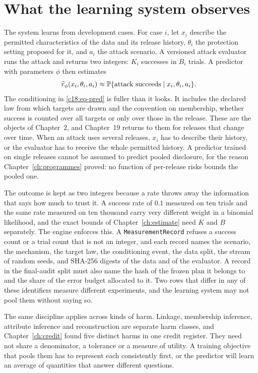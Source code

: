 \section{What the learning system observes}\label{c18:sec-observe}

The system learns from development cases. For case $i$, let $x_i$ describe the permitted
characteristics of the data and its release history, $\theta_i$ the protection setting proposed for it, and $a_i$ the attack scenario. A versioned attack evaluator runs the attack and returns two integers: $K_i$
successes in $B_i$ trials. A predictor with parameters $\phi$ then estimates
\begin{equation}\label{c18:eq-pred}
\widehat r_\phi(x_i,\theta_i,a_i)\approx \mathbb{P}\{\text{attack succeeds}\mid x_i,\theta_i,a_i\}.
\end{equation}
The conditioning in \eqref{c18:eq-pred} is fuller than it looks. It includes the declared law from which
targets are drawn and the convention on membership, whether success is counted over all
targets or only over those in the release. These are the objects of Chapter~2, and Chapter~19
returns to them for releases that change over time. When an attack uses several releases, $x_i$
has to describe their history, or the evaluator has to receive the whole permitted history. A
predictor trained on single releases cannot be assumed to predict pooled disclosure, for the
reason Chapter~\ref{ch:programmes} proved: no function of per-release risks bounds the pooled one.

The outcome is kept as two integers because a rate throws away the information that says
how much to trust it. A success rate of $0.1$ measured on ten trials and the same rate measured
on ten thousand carry very different weight in a binomial likelihood, and the exact bounds
of Chapter~\ref{ch:estimate} need $K$ and $B$ separately. The engine enforces this. A \texttt{MeasurementRecord}
refuses a success count or a trial count that is not an integer, and each record names the
scenario, the mechanism, the target law, the conditioning event, the data split, the stream
of random seeds, and SHA-256 digests of the data and of the evaluator. A record in the
final-audit split must also name the hash of the frozen plan it belongs to and the share of the
error budget allocated to it. Two rows that differ in any of these identifiers measure different
experiments, and the learning system may not pool them without saying so.

The same discipline applies across kinds of harm. Linkage, membership inference, attribute inference and reconstruction are separate harm classes, and Chapter~\ref{ch:credit} found five
distinct harms in one credit register. They need not share a denominator, a tolerance or a
measure of utility. A training objective that pools them has to represent each consistently
first, or the predictor will learn an average of quantities that answer different questions.

